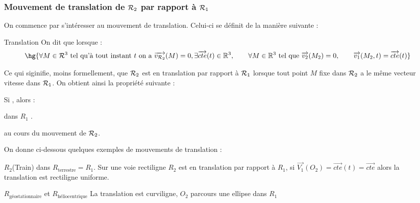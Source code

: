 \documentclass[a4paper,french,bookmarks]{book}
\begin{document}
    \subsubsection{Mouvement de translation de $\mathcal{R}_2$ par rapport à $\mathcal{R}_1$}
    
    On commence par s'intéresser au mouvement de translation. Celui-ci se définit de la manière suivante :

    \begin{definition}{Translation}{}
        On dit que  lorsque :
        \[ \hg{\forall M \in \bcR^3 \ \text{tel qu'à tout instant} \ t \ \text{on a} \  \vec{v_{\bcR_2}}\p{M} = 0, \exists \vec{cte}\p{t} \in \bdR^3,\qquad \forall M \in \bdR^3 \ \text{tel que} \ \vec{v_2}\p{M_2} = 0,\qquad \vec{v_1}\p{M_2, t} = \vec{cte}\p{t}}\]
    \end{definition}
    Ce qui siginifie, moins formellement, que $\mathcal{R}_2$ est en translation par rapport à $\mathcal{R}_1$ lorsque tout point $M$ fixe dans $\mathcal{R}_2$ a le même vecteur vitesse dans $\mathcal{R}_1$. 
    On obtient ainsi la propriété suivante :
    \begin{property}{}{}
        Si , alors :
        \begin{psse}
            \itast {} dans $R_1$ .
            
            \itast {} au cours du mouvement de $\mathcal{R}_2$.
        \end{psse}
    \end{property}
    
    On donne ci-dessous quelques exemples de mouvements de translation :

    \begin{example}{}{}
        \begin{enumerate}
            \itt \(R_2\)(Train) dans \(R_\text{terrestre} = R_1\). Sur une voie rectiligne \(R_2\) est 
            en translation par rapport à \(R_1\), si \(\vec{V_1}(O_2) = \vec{cte}(t) = \vec{cte}\) alors 
            la translation est rectiligne uniforme.

            \itt \(R_{\text{géostationnaire}}\) et \(R_\text{héliocentrique}\)
            La translation est curviligne, \(O_2\) parcours une ellipse dans \(R_1\)
        \end{enumerate}
    \end{example}
\end{document}
